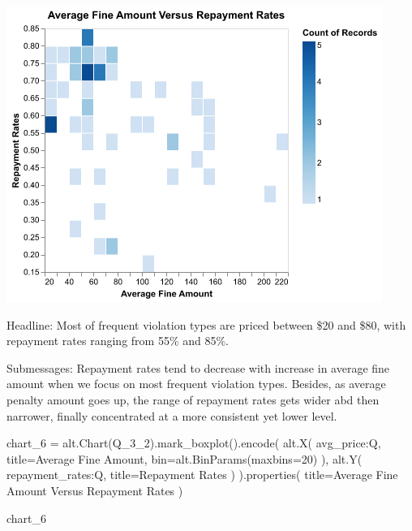 \documentclass[
  letterpaper,
  DIV=11,
  numbers=noendperiod]{scrartcl}
\newenvironment{Shaded}{\begin{snugshade}}{\end{snugshade}}
\newcommand{\BuiltInTok}[1]{\textcolor[rgb]{0.00,0.23,0.31}{#1}}
\newcommand{\DecValTok}[1]{\textcolor[rgb]{0.68,0.00,0.00}{#1}}
\newcommand{\NormalTok}[1]{\textcolor[rgb]{0.00,0.23,0.31}{#1}}
\newcommand{\OperatorTok}[1]{\textcolor[rgb]{0.37,0.37,0.37}{#1}}
\newcommand{\StringTok}[1]{\textcolor[rgb]{0.13,0.47,0.30}{#1}}
\begin{document}
\includegraphics[width=4.82292in,height=3.79167in]{PS2 Answer_files/figure-pdf/cell-16-output-1.png}

Headline: Most of frequent violation types are priced between \$20 and
\$80, with repayment rates ranging from 55\% and 85\%.

Submessages: Repayment rates tend to decrease with increase in average
fine amount when we focus on most frequent violation types. Besides, as
average penalty amount goes up, the range of repayment rates gets wider
abd then narrower, finally concentrated at a more consistent yet lower
level.

\begin{Shaded}
\begin{Highlighting}[]
\NormalTok{chart\_6 }\OperatorTok{=}\NormalTok{ alt.Chart(Q\_3\_2).mark\_boxplot().encode(}
\NormalTok{    alt.X(}
        \StringTok{\textquotesingle{}avg\_price:Q\textquotesingle{}}\NormalTok{, }
\NormalTok{        title}\OperatorTok{=}\StringTok{\textquotesingle{}Average Fine Amount\textquotesingle{}}\NormalTok{, }
        \BuiltInTok{bin}\OperatorTok{=}\NormalTok{alt.BinParams(maxbins}\OperatorTok{=}\DecValTok{20}\NormalTok{)}
\NormalTok{        ),}
\NormalTok{    alt.Y(}
        \StringTok{\textquotesingle{}repayment\_rates:Q\textquotesingle{}}\NormalTok{, }
\NormalTok{        title}\OperatorTok{=}\StringTok{\textquotesingle{}Repayment Rates\textquotesingle{}}
\NormalTok{        )}
\NormalTok{).properties(}
\NormalTok{    title}\OperatorTok{=}\StringTok{\textquotesingle{}Average Fine Amount Versus Repayment Rates\textquotesingle{}}
\NormalTok{)}

\NormalTok{chart\_6 }
\end{Highlighting}
\end{Shaded}
\end{document}
